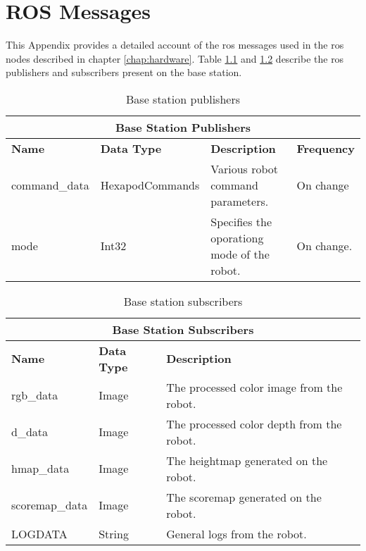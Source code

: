 \chapter{ROS Messages}\label{app:ros_comms}
    This Appendix provides a detailed account of the \ac{ros} messages used in the \ac{ros} nodes described in chapter \ref{chap:hardware}. Table \ref{tab:base_pubs} and \ref{tab:base_subs} describe the \ac{ros} publishers and subscribers present on the base station.
    \begin{table}[h]
        \centering
        \begin{tabularx}{\textwidth}{| l | l | X | l |}
            \hline
            \multicolumn{4}{|c|}{\textbf{Base Station Publishers}} \\ \hline
            \textbf{Name} & \textbf{Data Type} & \textbf{Description} & \textbf{Frequency} \\ \hline
            command\_data & HexapodCommands & Various robot command parameters. & On change \\ \hline
            mode & Int32 & Specifies the oporationg mode of the robot. & On change. \\ \hline
        \end{tabularx}
        \caption{Base station publishers}
        \label{tab:base_pubs}
    \end{table}
    \begin{table}[h]
        \centering
        \begin{tabularx}{\textwidth}{| l | l | X |}
            \hline
            \multicolumn{3}{|c|}{\textbf{Base Station Subscribers}} \\ \hline
            \textbf{Name} & \textbf{Data Type} & \textbf{Description} \\ \hline
            rgb\_data & Image & The processed color image from the robot. \\ \hline
            d\_data & Image & The processed color depth from the robot. \\ \hline
            hmap\_data & Image & The heightmap generated on the robot. \\ \hline
            scoremap\_data & Image & The scoremap generated on the robot. \\ \hline
            LOGDATA & String & General logs from the robot. \\ \hline
        \end{tabularx}
        \caption{Base station subscribers}
        \label{tab:base_subs}
    \end{table}

